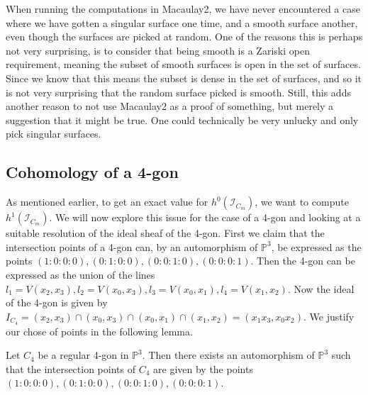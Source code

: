 \begin{remark}
    When running the computations in Macaulay2, we have never encountered a case where we have gotten a singular surface one time, and a smooth surface another, even though the surfaces are picked at random. One of the reasons this is perhaps not very surprising, is to consider that being smooth is a Zariski open requirement, meaning the subset of smooth surfaces is open in the set of surfaces. Since we know that this means the subset is dense in the set of surfaces, and so it is not very surprising that the random surface picked is smooth. Still, this adds another reason to not use Macaulay2 as a proof of something, but merely a suggestion that it might be true. One could technically be very unlucky and only pick singular surfaces.
\end{remark}


\subsection{Cohomology of a 4-gon}\label{sec:4-gon-cohomology}

As mentioned earlier, to get an exact value for $h^0(\mathcal{I}_{C_m})$, we want to compute $h^1(\mathcal{I}_{C_m})$. We will now explore this issue for the case of a 4-gon and looking at a suitable resolution of the ideal sheaf of the 4-gon. First we claim that the intersection points of a 4-gon can, by an automorphism of $\mathbb{P}^3$, be expressed as the points $(1:0:0:0), (0:1:0:0), (0:0:1:0), (0:0:0:1)$. Then the 4-gon can be expressed as the union of the lines $l_1 = V(x_2, x_3), l_2 = V(x_0, x_3), l_3 = V(x_0, x_1), l_4 = V(x_1, x_2)$. Now the ideal of the 4-gon is given by $I_{C_4} = (x_2, x_3) \cap (x_0, x_3) \cap (x_0, x_1) \cap (x_1, x_2) = (x_1x_3, x_0x_2)$. We justify our chose of points in the following lemma.

\begin{lemma}\label{lem:gen-points}
    Let $C_4$ be a regular 4-gon in $\mathbb{P}^3$. Then there exists an automorphism of $\mathbb{P}^3$ such that the intersection points of $C_4$ are given by the points $(1:0:0:0), (0:1:0:0), (0:0:1:0), (0:0:0:1)$.
\end{lemma}

